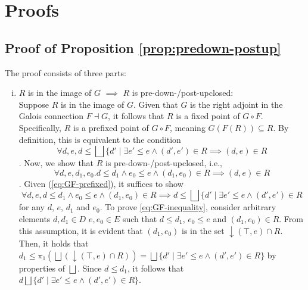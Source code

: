 \documentclass{llncs}
\newcommand{\bigjoin}{\bigsqcup}
\newcommand{\comp}{\circ}
\begin{document}
\nocite{*}  %
  

  

\appendix
\section{Proofs}
\subsection{Proof of Proposition \ref{prop:predown-postup}}
The proof consists of three parts:
\begin{enumerate}[i.]
\item{$R$ is in the image of $G$ $\implies$ $R$ is pre-down-/post-upclosed:}\\
  Suppose $R$ is in the image of $G$.
  Given that $G$ is the right adjoint in the Galois connection $F \dashv G$, it follows that $R$ is a fixed point of $G \comp F$. Specifically, $R$ is a prefixed point of $G \comp F$, meaning $G(F(R)) \subseteq R$. By definition, this is equivalent to the condition
  \begin{equation}
    \forall d, e, d \leq \bigjoin \{ d' \mid \exists e' \leq e \land (d', e') \in R \implies (d , e) \in R \label{eq:GF-prefixed}
  \end{equation}.
  Now, we show that $R$ is pre-down-/post-upclosed, i.e.,
  \begin{equation}
   \forall d, e, d_{1 }, e_{0}.d \leq d_{1} \land e_{0} \leq e \land (d_{1}, e_{0}) \in R \implies (d, e) \in R
   \label{eq:GF-pre-post}
  \end{equation}.
  Given (\ref{eq:GF-prefixed}), it suffices to show
  \begin{equation}
    \forall d, e, d \leq d_{1} \land e_{0} \leq e \land (d_{1}, e_{0}) \in R \implies d \leq \bigjoin \{ d' \mid \exists e' \leq e \land (d', e') \in R \label{eq:GF-inequality}
  \end{equation} for any $d$, $e$, $d_{1}$ and $e_{0}$.  To prove \ref{eq:GF-inequality}, consider arbitrary elements $d, d_{1} \in D$ $e, e_{0} \in E$ such that $d \leq d_{1}$, $e_{0} \leq e$ and $(d_{1}, e_{0}) \in R$.
  From this assumption, it is evident that $(d_{1} , e_{0})$ is in the set $\downarrow (\top , e) \cap R$.
  Then, it holds that $d_{1}  \leq \pi_{1} (\bigjoin (\downarrow (\top , e) \cap R)) = \bigjoin \{ d' \mid \exists e' \leq e \land (d', e') \in R \}$ by properties of $\bigjoin$. Since $d \leq d_{1}$, it follows that $d \bigjoin \{ d' \mid \exists e' \leq e \land (d', e') \in R \}$.


\end{enumerate}
\end{document}
